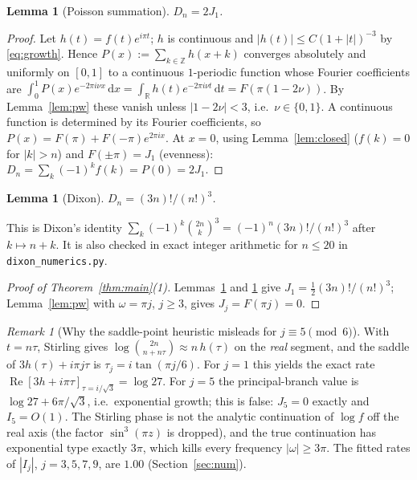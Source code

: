 \documentclass[11pt]{amsart}
\newtheorem{lemma}[theorem]{Lemma}
\theoremstyle{remark}
\newtheorem{remark}[theorem]{Remark}
\newcommand{\R}{\mathbb{R}}
\newcommand{\Z}{\mathbb{Z}}
\newcommand{\dd}{\,\mathrm{d}}
\begin{document}
\begin{lemma}[Poisson summation]\label{lem:poisson}
$D_n=2J_1$.
\end{lemma}

\begin{proof}
Let $h(t)=f(t)e^{i\pi t}$; $h$ is continuous and $|h(t)|\le C(1+|t|)^{-3}$ by \eqref{eq:growth}. Hence
$P(x):=\sum_{k\in\Z}h(x+k)$ converges absolutely and uniformly on $[0,1]$ to a continuous $1$-periodic function whose
Fourier coefficients are $\int_0^1P(x)e^{-2\pi i\nu x}\dd x=\int_\R h(t)e^{-2\pi i\nu t}\dd t=F(\pi(1-2\nu))$.
By Lemma~\ref{lem:pw} these vanish unless $|1-2\nu|<3$, i.e.\ $\nu\in\{0,1\}$. A continuous function is determined by its
Fourier coefficients, so $P(x)=F(\pi)+F(-\pi)e^{2\pi ix}$. At $x=0$, using Lemma~\ref{lem:closed}
($f(k)=0$ for $|k|>n$) and $F(\pm\pi)=J_1$ (evenness): $D_n=\sum_k(-1)^kf(k)=P(0)=2J_1$.
\end{proof}

\begin{lemma}[Dixon]\label{lem:dixon}
$D_n=(3n)!/(n!)^3$.
\end{lemma}
This is Dixon's identity $\sum_k(-1)^k\binom{2n}{k}^3=(-1)^n(3n)!/(n!)^3$ \cite{Dixon,Ekhad} after $k\mapsto n+k$.
It is also checked in exact integer arithmetic for $n\le 20$ in \texttt{dixon\_numerics.py}.

\begin{proof}[Proof of Theorem~\ref{thm:main}(1)]
Lemmas~\ref{lem:poisson} and \ref{lem:dixon} give $J_1=\frac12(3n)!/(n!)^3$; Lemma~\ref{lem:pw} with $\omega=\pi j$,
$j\ge3$, gives $J_j=F(\pi j)=0$.
\end{proof}

\begin{remark}[Why the saddle-point heuristic misleads for $j\equiv5\pmod6$]
With $t=n\tau$, Stirling gives $\log\binom{2n}{n+n\tau}\approx n\,h(\tau)$ on the \emph{real} segment, and the saddle of
$3h(\tau)+i\pi j\tau$ is $\tau_j=i\tan(\pi j/6)$. For $j=1$ this yields the exact rate $\operatorname{Re}[3h+i\pi\tau]_{\tau=i/\sqrt3}=\log27$.
For $j=5$ the principal-branch value is $\log27+6\pi/\sqrt3$, i.e.\ exponential growth; this is false: $J_5=0$ exactly and $I_5=O(1)$.
The Stirling phase is not the analytic continuation of $\log f$ off the real axis (the factor $\sin^3(\pi z)$ is dropped), and the
true continuation has exponential type exactly $3\pi$, which kills every frequency $|\omega|\ge3\pi$. The fitted rates of
$|I_j|$, $j=3,5,7,9$, are $1.00$ (Section~\ref{sec:num}).
\end{remark}
\end{document}
